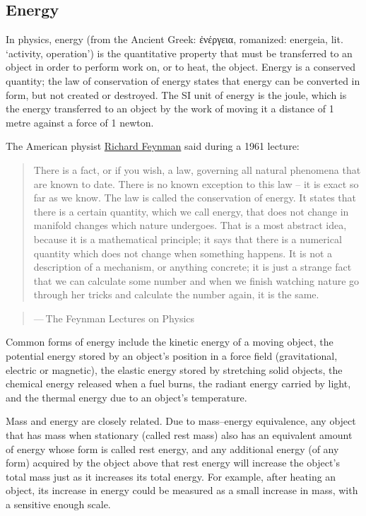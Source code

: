 \documentclass[
]{article}
\begin{document}
\hypertarget{energy}{%
\subsection{Energy}\label{energy}}

In physics, energy (from the Ancient Greek: ἐνέργεια, romanized:
energeia, lit. `activity, operation') is the quantitative property that
must be transferred to an object in order to perform work on, or to
heat, the object. Energy is a conserved quantity; the law of
conservation of energy states that energy can be converted in form, but
not created or destroyed. The SI unit of energy is the joule, which is
the energy transferred to an object by the work of moving it a distance
of 1 metre against a force of 1 newton.

The American physist
\href{https://en.wikipedia.org/wiki/Richard_Feynman}{Richard Feynman}
said during a 1961 lecture:

\begin{quote}
There is a fact, or if you wish, a law, governing all natural phenomena
that are known to date. There is no known exception to this law -- it is
exact so far as we know. The law is called the conservation of energy.
It states that there is a certain quantity, which we call energy, that
does not change in manifold changes which nature undergoes. That is a
most abstract idea, because it is a mathematical principle; it says that
there is a numerical quantity which does not change when something
happens. It is not a description of a mechanism, or anything concrete;
it is just a strange fact that we can calculate some number and when we
finish watching nature go through her tricks and calculate the number
again, it is the same.
\end{quote}

\begin{quote}
--- The Feynman Lectures on Physics
\end{quote}

Common forms of energy include the kinetic energy of a moving object,
the potential energy stored by an object's position in a force field
(gravitational, electric or magnetic), the elastic energy stored by
stretching solid objects, the chemical energy released when a fuel
burns, the radiant energy carried by light, and the thermal energy due
to an object's temperature.

Mass and energy are closely related. Due to mass--energy equivalence,
any object that has mass when stationary (called rest mass) also has an
equivalent amount of energy whose form is called rest energy, and any
additional energy (of any form) acquired by the object above that rest
energy will increase the object's total mass just as it increases its
total energy. For example, after heating an object, its increase in
energy could be measured as a small increase in mass, with a sensitive
enough scale.
\end{document}
